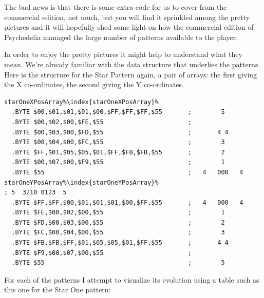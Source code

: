 The bad news is that there is some extra code for us to cover from the commercial edition, not much,
but you will find it sprinkled among the pretty pictures and it will hopefully shed some light
on how the commercial edition of Psychedelia managed the large number of patterns available to the
player.

In order to enjoy the pretty pictures it might help to understand what they mean. We're already 
familiar with the data structure that underlies the patterns. Here is the structure for the Star
Pattern again, a pair of arrays: the first giving the X co-ordinates, the second giving the Y
co-ordinates.
\clearpage
\begin{lstlisting}[caption=Source code for the Star.,escapechar=\%]
starOneXPosArray%\index{starOneXPosArray}%  
  .BYTE $00,$01,$01,$01,$00,$FF,$FF,$FF,$55       ;        5       
  .BYTE $00,$02,$00,$FE,$55                       ;                
  .BYTE $00,$03,$00,$FD,$55                       ;       4 4      
  .BYTE $00,$04,$00,$FC,$55                       ;        3       
  .BYTE $FF,$01,$05,$05,$01,$FF,$FB,$FB,$55       ;        2       
  .BYTE $00,$07,$00,$F9,$55                       ;        1       
  .BYTE $55                                       ;   4   000   4  
starOneYPosArray%\index{starOneYPosArray}%                                  ; 5  3210 0123  5  
  .BYTE $FF,$FF,$00,$01,$01,$01,$00,$FF,$55       ;   4   000   4  
  .BYTE $FE,$00,$02,$00,$55                       ;        1       
  .BYTE $FD,$00,$03,$00,$55                       ;        2       
  .BYTE $FC,$00,$04,$00,$55                       ;        3       
  .BYTE $FB,$FB,$FF,$01,$05,$05,$01,$FF,$55       ;       4 4      
  .BYTE $F9,$00,$07,$00,$55                       ;                
  .BYTE $55                                       ;        5       
\end{lstlisting}

For each of the patterns I attempt to visualize its evolution using a table such as this one for 
the Star One pattern:

